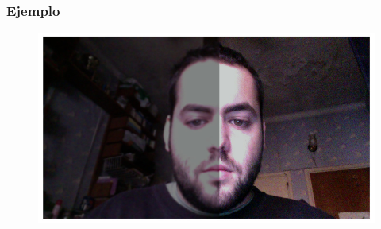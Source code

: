 \subsubsection*{Ejemplo}
\begin{center}
  \begin{figure}[H]
  \includegraphics[scale=0.40]{imgs/median.png}
  \end{figure}  
\end{center}  
